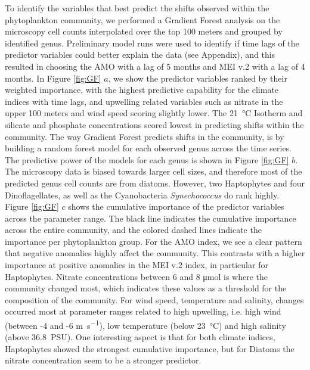 \documentclass[draft]{agujournal2019}
\begin{document}
To identify the variables that best predict the shifts observed within the phytoplankton community, we performed a Gradient Forest analysis on the microscopy cell counts interpolated over the top 100 meters and grouped by identified genus. Preliminary model runs were used to identify if time lags of the predictor variables could better explain the data (see Appendix), and this resulted in choosing the AMO with a lag of 5 months and MEI v.2 with a lag of 4 months. In Figure \ref{fig:GF} $a$, we show the predictor variables ranked by their weighted importance, with the highest predictive capability for the climate indices with time lags, and upwelling related variables such as nitrate in the upper 100 meters and wind speed scoring slightly lower. The \qty{21}{\celsius} Isotherm and silicate and phosphate concentrations scored lowest in predicting shifts within the community. The way Gradient Forest predicts shifts in the community, is by building a random forest model for each observed genus across the time series. The predictive power of the models for each genus is shown in Figure \ref{fig:GF} $b$. The microscopy data is biased towards larger cell sizes, and therefore most of the predicted genus cell counts are from diatoms. However, two Haptophytes and four Dinoflagellates, as well as the Cyanobacteria \textit{Synechococcus} do rank highly.
Figure \ref{fig:GF} $c$ shows the cumulative importance of the predictor variables across the parameter range. The black line indicates the cumulative importance across the entire community, and the colored dashed lines indicate the importance per phytoplankton group. For the AMO index, we see a clear pattern that negative anomalies highly affect the community. This contrasts with a higher importance at positive anomalies in the MEI v.2 index, in particular for Haptophytes. Nitrate concentrations between 6 and 8 \unit{\micro \mole} is where the community changed most, which indicates these values as a threshold for the composition of the community. For wind speed, temperature and salinity, changes occurred most at parameter ranges related to high upwelling, i.e. high wind (between -4 and -6 \unit{m.s^{-1}}), low temperature (below \qty{23}{\celsius}) and high salinity (above \qty{36.8}{PSU}). One interesting aspect is that for both climate indices, Haptophytes showed the strongest cumulative importance, but for Diatoms the nitrate concentration seem to be a stronger predictor. 
\end{document}
